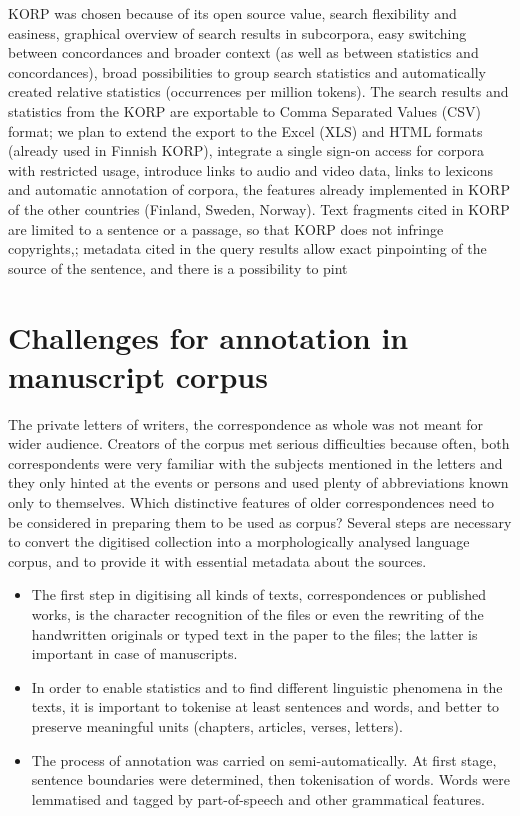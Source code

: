 \documentclass[runningheads]{llncs}
\begin{document}
KORP was chosen because of its open source value, search flexibility and easiness, graphical overview of search results in subcorpora, easy switching between concordances and broader context (as well as between statistics and concordances), broad possibilities to group search statistics and automatically created relative statistics (occurrences per million tokens).  The search results and statistics from the KORP are exportable to Comma Separated Values (CSV) format; we plan to extend the export to the Excel (XLS) and HTML formats (already used in Finnish KORP),  integrate a single sign-on access for corpora with restricted usage, introduce links to audio and video data, links to lexicons and automatic annotation of corpora, the features already implemented in KORP of the other countries (Finland, Sweden, Norway). Text fragments cited in KORP are limited to a sentence or a passage, so that KORP does not infringe copyrights,; metadata cited in the query results allow exact pinpointing of the source of the sentence, and there is a possibility to pint


\section{Challenges for annotation in manuscript corpus}

The private letters of writers, the correspondence as whole was not meant for wider audience. Creators of the corpus met serious difficulties because often, both correspondents were very familiar with the subjects mentioned in the letters and they only hinted at the events or persons and used plenty of abbreviations known only to themselves. Which distinctive features of older correspondences need to be considered in preparing them to be used as corpus? Several steps are necessary to convert the digitised collection into a morphologically analysed language corpus, and to provide it with essential metadata about the sources.

\begin{itemize}
\item The first step in digitising all kinds of texts, correspondences or published works, is the character recognition of the files or even the rewriting of the handwritten originals or typed text in the paper to the files; the latter is important in case of manuscripts. 

\item In order to enable statistics and to find different linguistic phenomena in the texts, it is important to tokenise at least sentences and words, and better to preserve meaningful units (chapters, articles, verses, letters). 

  \item The process of annotation was carried on semi-automatically. At first stage, sentence boundaries were determined, then tokenisation of words.  Words were lemmatised and tagged by part-of-speech and other grammatical features.

\end{itemize}
\end{document}
